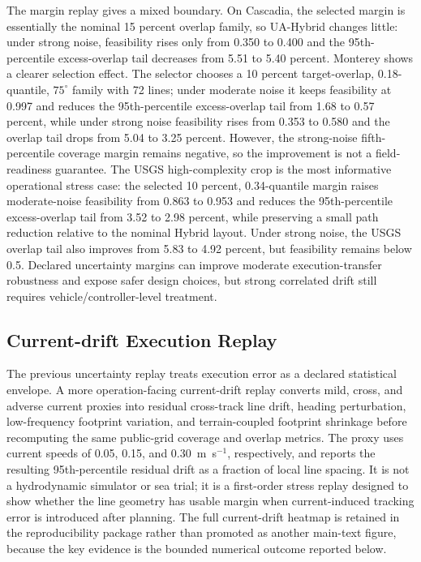\documentclass[jmse,article,submit,moreauthors]{Definitions/mdpi}
\begin{document}
The margin replay gives a mixed boundary. On Cascadia, the selected margin is essentially the nominal 15 percent overlap family, so UA-Hybrid changes little: under strong noise, feasibility rises only from 0.350 to 0.400 and the 95th-percentile excess-overlap tail decreases from 5.51 to 5.40 percent. Monterey shows a clearer selection effect. The selector chooses a 10 percent target-overlap, 0.18-quantile, \(75^{\circ}\) family with 72 lines; under moderate noise it keeps feasibility at 0.997 and reduces the 95th-percentile excess-overlap tail from 1.68 to 0.57 percent, while under strong noise feasibility rises from 0.353 to 0.580 and the overlap tail drops from 5.04 to 3.25 percent. However, the strong-noise fifth-percentile coverage margin remains negative, so the improvement is not a field-readiness guarantee. The USGS high-complexity crop is the most informative operational stress case: the selected 10 percent, 0.34-quantile margin raises moderate-noise feasibility from 0.863 to 0.953 and reduces the 95th-percentile excess-overlap tail from 3.52 to 2.98 percent, while preserving a small path reduction relative to the nominal Hybrid layout. Under strong noise, the USGS overlap tail also improves from 5.83 to 4.92 percent, but feasibility remains below 0.5. Declared uncertainty margins can improve moderate execution-transfer robustness and expose safer design choices, but strong correlated drift still requires vehicle/controller-level treatment.

\subsection{Current-drift Execution Replay}
The previous uncertainty replay treats execution error as a declared statistical envelope. A more operation-facing current-drift replay converts mild, cross, and adverse current proxies into residual cross-track line drift, heading perturbation, low-frequency footprint variation, and terrain-coupled footprint shrinkage before recomputing the same public-grid coverage and overlap metrics. The proxy uses current speeds of 0.05, 0.15, and 0.30~m~s\(^{-1}\), respectively, and reports the resulting 95th-percentile residual drift as a fraction of local line spacing. It is not a hydrodynamic simulator or sea trial; it is a first-order stress replay designed to show whether the line geometry has usable margin when current-induced tracking error is introduced after planning. The full current-drift heatmap is retained in the reproducibility package rather than promoted as another main-text figure, because the key evidence is the bounded numerical outcome reported below.
\end{document}
